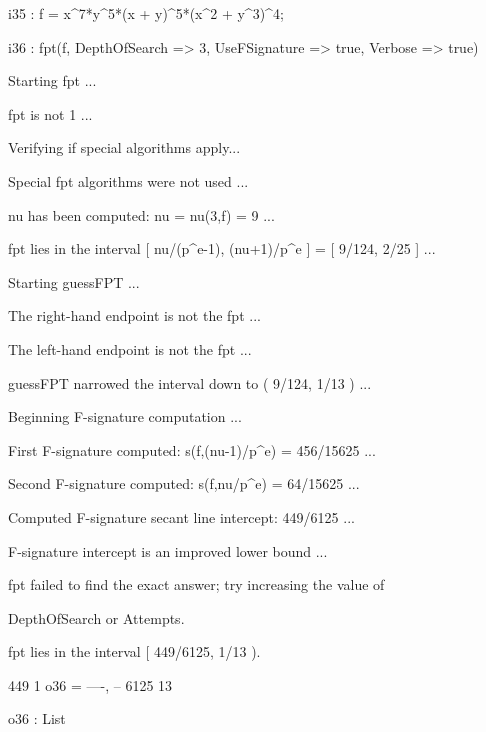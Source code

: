 \documentclass{amsart}
\begin{document}
{\small
{}
\begin{MyVerbatim}

i35 : f = x^7*y^5*(x + y)^5*(x^2 + y^3)^4;

i36 : fpt(f, DepthOfSearch => 3, UseFSignature => true, Verbose => true)

Starting fpt ...

fpt is not 1 ...

Verifying if special algorithms apply...

Special fpt algorithms were not used ...

nu has been computed: nu = nu(3,f) = 9 ...

fpt lies in the interval [ nu/(p^e-1), (nu+1)/p^e ] = [ 9/124, 2/25 ] ...

Starting guessFPT ...

The right-hand endpoint is not the fpt ...

The left-hand endpoint is not the fpt ...

guessFPT narrowed the interval down to ( 9/124, 1/13 ) ...

Beginning F-signature computation ...

First F-signature computed: s(f,(nu-1)/p^e) = 456/15625 ...

Second F-signature computed: s(f,nu/p^e) = 64/15625 ...

Computed F-signature secant line intercept: 449/6125 ...

F-signature intercept is an improved lower bound ...

fpt failed to find the exact answer; try increasing the value of

DepthOfSearch or Attempts.

fpt lies in the interval [ 449/6125, 1/13 ).

        449   1
o36 = {----, --}
       6125  13

o36 : List
\end{MyVerbatim}
}
\medspace



\end{document}
